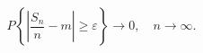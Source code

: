 $$P\left\{\left|\frac{S_n}{n} - m\right| \geq \varepsilon\right\} \rightarrow 0, \quad n \rightarrow \infty.$$
